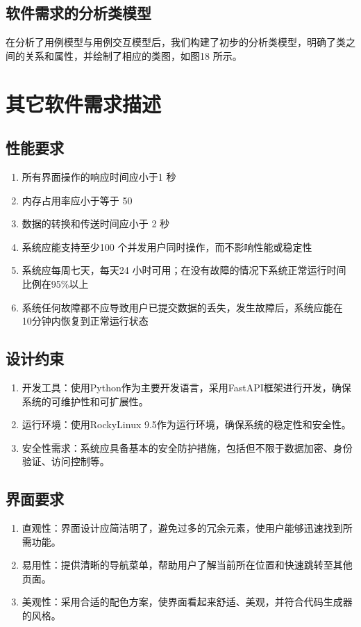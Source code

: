 \documentclass[
    report,     %
    oneside,    %
    UTF8,       %
    zihao=-4    %
]{config} %
\begin{document}
\subsection{软件需求的分析类模型}

在分析了用例模型与用例交互模型后，我们构建了初步的分析类模型，明确了类之间的关系和属性，并绘制了相应的类图，如图18 所示。

\section{其它软件需求描述}
\subsection{性能要求}
\begin{enumerate}[label=(\arabic*)]
    \item 所有界面操作的响应时间应小于1 秒
    \item 内存占用率应小于等于 50%
    \item 数据的转换和传送时间应小于 2 秒
    \item 系统应能支持至少100 个并发用户同时操作，而不影响性能或稳定性
    \item 系统应每周七天，每天24 小时可用；在没有故障的情况下系统正常运行时间比例在95\%以上
    \item 系统任何故障都不应导致用户已提交数据的丢失，发生故障后，系统应能在 10分钟内恢复到正常运行状态
\end{enumerate}

\subsection{设计约束}

\begin{enumerate}[label=(\arabic*)]
    \item 开发工具：使用Python作为主要开发语言，采用FastAPI框架进行开发，确保系统的可维护性和可扩展性。
    \item 运行环境：使用RockyLinux 9.5作为运行环境，确保系统的稳定性和安全性。
    \item 安全性需求：系统应具备基本的安全防护措施，包括但不限于数据加密、身份验证、访问控制等。
\end{enumerate}
\subsection{界面要求}
\begin{enumerate}[label=(\arabic*)]
    \item 直观性：界面设计应简洁明了，避免过多的冗余元素，使用户能够迅速找到所需功能。
    \item 易用性：提供清晰的导航菜单，帮助用户了解当前所在位置和快速跳转至其他页面。
    \item 美观性：采用合适的配色方案，使界面看起来舒适、美观，并符合代码生成器的风格。
\end{enumerate}
\end{document}
